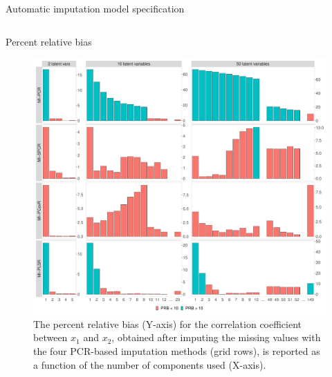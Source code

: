 \documentclass{beamer}\usepackage[]{graphicx}\usepackage[]{xcolor}
\makeatletter
\def\maxwidth{ %
  \ifdim\Gin@nat@width>\linewidth
    \linewidth
  \else
    \Gin@nat@width
  \fi
}
\newenvironment{knitrout}{}{} %
\makeatother
\begin{document}
\begin{frame}[fragile]
\begin{columns}[T]
\begin{column}{.42\textwidth}
\begin{block}{\centering Automatic imputation model specification}
\end{block}

\end{column}

\end{columns}

\bigskip
{\hrulefill}
\bigskip


\begin{columns}


  \begin{column}{.46\textwidth}
    \begin{block}{\centering Percent relative bias}

      \begin{figure}
        \centering
\begin{knitrout}
\color{fgcolor}

{\centering \includegraphics[width=\maxwidth]{figure/plot-prb-1} 

}


\end{knitrout}
          \caption{
            \label{fig:prb-text} 
            The percent relative bias (Y-axis) for the correlation coefficient between $x_1$ and $x_2$, obtained after imputing the missing values with the four PCR-based imputation methods (grid rows), is reported as a function of the number of components used (X-axis).
            }
        \end{figure}
        

\end{block}
\end{column}
\end{columns}
\end{frame}
\end{document}
